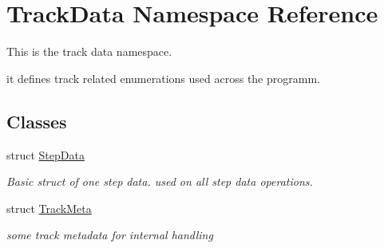 \hypertarget{namespaceTrackData}{\section{Track\-Data Namespace Reference}
\label{namespaceTrackData}
}


This is the track data namespace.\par
 it defines track related enumerations used across the programm.  


\subsection*{Classes}
\begin{DoxyCompactItemize}
\item 
struct \hyperlink{structTrackData_1_1StepData}{Step\-Data}
\begin{DoxyCompactList}\small\item\em Basic struct of one step data. used on all step data operations. \end{DoxyCompactList}\item 
struct \hyperlink{structTrackData_1_1TrackMeta}{Track\-Meta}
\begin{DoxyCompactList}\small\item\em some track metadata for internal handling \end{DoxyCompactList}\end{DoxyCompactItemize}
